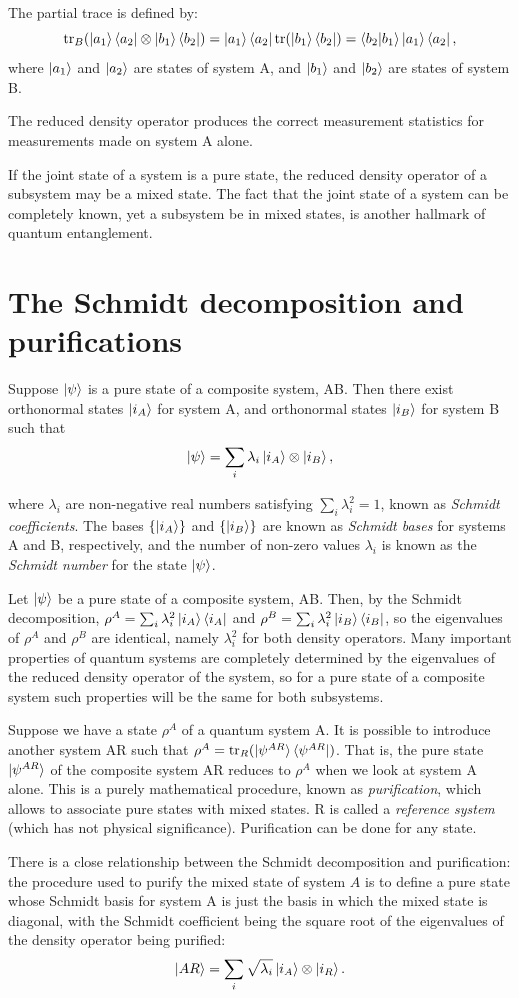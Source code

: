 The partial trace is defined by:
\[
    \operatorname{tr}_B(\ket{a_1}\bra{a_2} \otimes \ket{b_1}\bra{b_2}) = \ket{a_1}\bra{a_2} \operatorname{tr}(\ket{b_1}\bra{b_2}) = \braket{b_2|b_1}\ket{a_1}\bra{a_2},
\]
where $\ket{a_1}$ and $\ket{a_2}$ are states of system A, and $\ket{b_1}$ and $\ket{b_2}$ are states of system B.

The reduced density operator produces the correct measurement statistics for measurements made on system A alone.

If the joint state of a system is a pure state,
the reduced density operator of a subsystem may be a mixed state.
The fact that the joint state of a system can be completely known,
yet a subsystem be in mixed states,
is another hallmark of quantum entanglement.

\section{The Schmidt decomposition and purifications}
\begin{theorem}
    Suppose $\ket{\psi}$ is a pure state of a composite system, AB.
    Then there exist orthonormal states $\ket{i_A}$ for system A,
     and orthonormal states $\ket{i_B}$ for system B such that
     \[
        \ket{\psi} = \sum_i \lambda_i \ket{i_A} \otimes \ket{i_B},
     \]
\end{theorem}
where $\lambda_i$ are non-negative real numbers satisfying $\sum_i \lambda_i^2 = 1$,
known as \emph{Schmidt coefficients}.
The bases $\{\ket{i_A}\}$ and $\{\ket{i_B}\}$ are known as \emph{Schmidt bases} for systems A and B, respectively,
and the number of non-zero values $\lambda_i$ is known as the \emph{Schmidt number} for the state $\ket{\psi}$.

Let $\ket{\psi}$ be a pure state of a composite system, AB.
Then, by the Schmidt decomposition, $\rho^A = \sum_i \lambda_i^2 \ket{i_A}\bra{i_A}$ and $\rho^B = \sum_i \lambda_i^2 \ket{i_B}\bra{i_B}$,
so the eigenvalues of $\rho^A$ and $\rho^B$ are identical,
namely $\lambda_i^2$ for both density operators.
Many important properties of quantum systems are completely determined by the eigenvalues of the reduced density operator of the system,
so for a pure state of a composite system such properties will be the same for both subsystems.

Suppose we have a state $\rho^A$ of a quantum system A.
It is possible to introduce another system AR such that $\rho^A=\operatorname{tr}_R(\ket{\psi^{AR}}\bra{\psi^{AR}})$.
That is, the pure state $\ket{\psi^{AR}}$ of the composite system AR reduces to $\rho^A$ when we look at system A alone.
This is a purely mathematical procedure, known as \emph{purification},
which allows to associate pure states with mixed states.
R is called a \emph{reference system} (which has not physical significance).
Purification can be done for any state.

There is a close relationship between the Schmidt decomposition and purification:
the procedure used to purify the mixed state of system $A$ is to define a pure state whose Schmidt basis for system A is just the basis in which the mixed state is diagonal,
with the Schmidt coefficient being the square root of the eigenvalues of the density operator being purified:
\[
    \ket{AR} = \sum_i \sqrt{\lambda_i} \ket{i_A} \otimes \ket{i_R}.
\]
